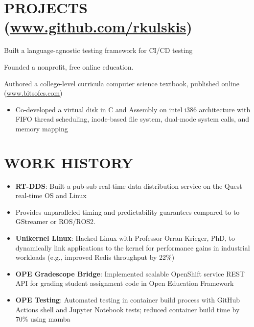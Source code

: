 \documentclass[10pt]{article}
\begin{document}
\begin{FlushLeft}
  \section{PROJECTS (\href{www.github.com/rkulskis}{www.github.com/rkulskis})}
  \begin{itemize}{
    \item Built a language-agnostic testing framework for CI/CD testing
    }
  \end{itemize}  
  \begin{itemize}{
    \item Founded a nonprofit, free online education.
    \item Authored a college-level curricula computer science textbook, published online (\href{www.bitsofcs.com}{www.bitsofcs.com})
    }
  \end{itemize}
  
  \begin{itemize}
  \item Co-developed a virtual disk in C and Assembly on intel i386 architecture with FIFO thread scheduling, inode-based file system, dual-mode system calls, and memory mapping
  \end{itemize}
  
\section{WORK HISTORY}

\begin{itemize}
\item \textbf{RT-DDS}: Built a pub-sub real-time data distribution service on the Quest real-time OS and Linux
  \item Provides unparalleled timing and predictability guarantees compared to to GStreamer or ROS/ROS2.
\end{itemize}

\begin{itemize}
\item \textbf{Unikernel Linux}: Hacked Linux with Professor Orran Krieger, PhD, to dynamically link applications to the kernel for performance gains in industrial workloads (e.g., improved Redis throughput by 22\%)
\item \textbf{OPE Gradescope Bridge}: Implemented scalable OpenShift service REST API for grading student assignment code in Open Education Framework
\item \textbf{OPE Testing}: Automated testing in container build process with GitHub Actions shell and Jupyter Notebook tests; reduced container build time by 70\% using mamba
\end{itemize}


\end{FlushLeft}
\end{document}
